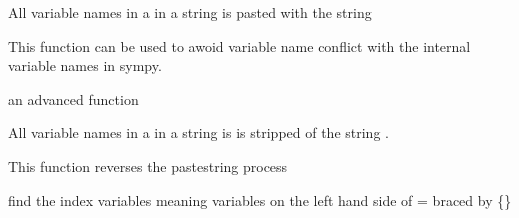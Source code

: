 \documentclass[letterpaper,10pt,english]{sphinxmanual}
\begin{document}

\begin{fulllineitems}
\label{\detokenize{index:modelmanipulation.pastestring}}
\pysigstartsignatures
{}
\pysigstopsignatures
\sphinxAtStartPar
All variable names in a  in a string  is pasted with the string 

\sphinxAtStartPar
This function can be used to awoid variable name conflict with the internal variable names in sympy.

\sphinxAtStartPar
an advanced function

\end{fulllineitems}


\begin{fulllineitems}
\label{\detokenize{index:modelmanipulation.stripstring}}
\pysigstartsignatures
{}
\pysigstopsignatures
\sphinxAtStartPar
All variable names in a  in a string is  is stripped of the string .

\sphinxAtStartPar
This function reverses the pastestring process

\end{fulllineitems}


\begin{fulllineitems}
\label{\detokenize{index:modelmanipulation.findindex}}
\pysigstartsignatures
{}
\pysigstopsignatures
\sphinxAtStartPar
find the index variables meaning variables on the left hand side of = braced by \{\}

\end{fulllineitems}
\end{document}
